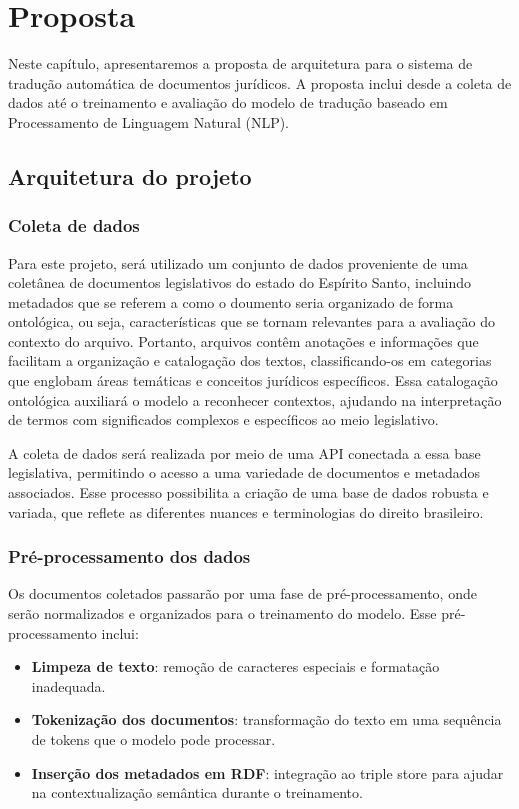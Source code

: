 \chapter{Proposta}

Neste capítulo, apresentaremos a proposta de arquitetura para o sistema de tradução automática de documentos jurídicos. A proposta inclui desde a coleta de dados até o treinamento e avaliação do modelo de tradução baseado em Processamento de Linguagem Natural (NLP).

\section{Arquitetura do projeto}

\subsection{Coleta de dados}

Para este projeto, será utilizado um conjunto de dados proveniente de uma coletânea de documentos legislativos do estado do Espírito Santo, incluindo metadados que se referem a como o doumento seria organizado de forma ontológica, ou seja, características que se tornam relevantes para a avaliação do contexto do arquivo. Portanto, arquivos contêm anotações e informações que facilitam a organização e catalogação dos textos, classificando-os em categorias que englobam áreas temáticas e conceitos jurídicos específicos. Essa catalogação ontológica auxiliará o modelo a reconhecer contextos, ajudando na interpretação de termos com significados complexos e específicos ao meio legislativo.

A coleta de dados será realizada por meio de uma API conectada a essa base legislativa, permitindo o acesso a uma variedade de documentos e metadados associados. Esse processo possibilita a criação de uma base de dados robusta e variada, que reflete as diferentes nuances e terminologias do direito brasileiro.

\subsection{Pré-processamento dos dados}

Os documentos coletados passarão por uma fase de pré-processamento, onde serão normalizados e organizados para o treinamento do modelo. Esse pré-processamento inclui:
\begin{itemize}
    \item \textbf{Limpeza de texto}: remoção de caracteres especiais e formatação inadequada.
    \item \textbf{Tokenização dos documentos}: transformação do texto em uma sequência de tokens que o modelo pode processar.
    \item \textbf{Inserção dos metadados em RDF}: integração ao triple store para ajudar na contextualização semântica durante o treinamento.
\end{itemize}

